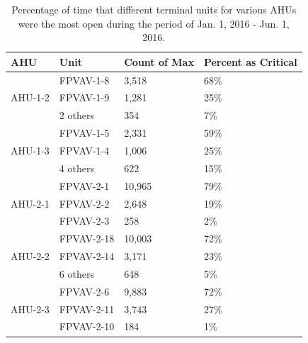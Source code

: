 \begin{table}
\centering
\caption{Percentage of time that different terminal units for various AHUs were the most open during the period of Jan. 1, 2016 - Jun. 1, 2016.}
\label{tab:AHU12CriticalZone}
\begin{tabular}{@{}llll@{}}
\toprule
AHU                       & Unit       & Count of Max & Percent as Critical \\ \midrule
\multirow{3}{*}{AHU-1-2}  & FPVAV-1-8  & 3,518        & 68\%                             \\
                          & FPVAV-1-9  & 1,281        & 25\%                             \\
                          & 2 others   & 354          & 7\%                 \\ \midrule
\multirow{3}{*}{AHU-1-3}  & FPVAV-1-5  & 2,331        & 59\%                             \\
                          & FPVAV-1-4  & 1,006        & 25\%                             \\
                          & 4 others   & 622          & 15\%                 \\ \midrule
\multirow{3}{*}{AHU-2-1}  & FPVAV-2-1  & 10,965       & 79\%                             \\
                          & FPVAV-2-2  & 2,648        & 19\%                             \\
                          & FPVAV-2-3  & 258          & 2\% \\ \midrule
\multirow{3}{*}{AHU-2-2}  & FPVAV-2-18 & 10,003       & 72\%                             \\
                          & FPVAV-2-14 & 3,171        & 23\%                             \\
                          & 6 others   & 648          & 5\%  \\ \midrule
\multirow{3}{*}{AHU-2-3}  & FPVAV-2-6  & 9,883        & 72\%                             \\
                          & FPVAV-2-11 & 3,743        & 27\%                             \\
                          & FPVAV-2-10 & 184          & 1\%  \\ \midrule
\end{tabular}
\end{table}


